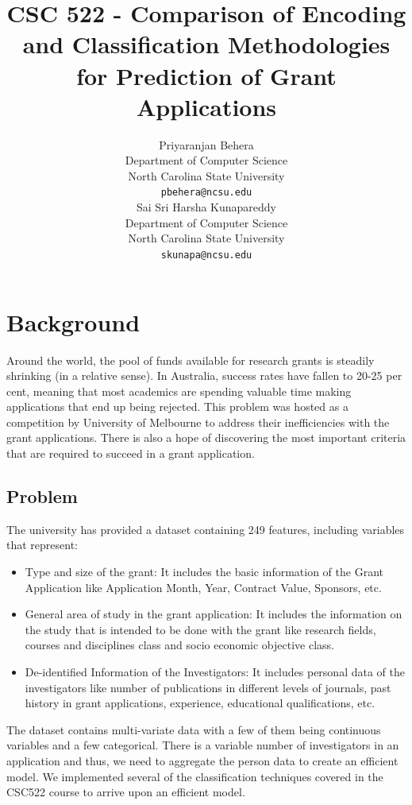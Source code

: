 \documentclass{article} %
\title{CSC 522 - Comparison of Encoding and Classification Methodologies for Prediction of Grant Applications}
\author{
	Priyaranjan Behera\\
	Department of Computer Science\\
	North Carolina State University\\
	\texttt{pbehera@ncsu.edu} \\
	\And
	Sai Sri Harsha Kunapareddy\\
	Department of Computer Science\\
	North Carolina State University\\
	\texttt{skunapa@ncsu.edu} \\
}
\begin{document}
	
	
	\maketitle
	
	\section{Background}
	
	Around the world, the pool of funds available for research grants is steadily shrinking (in a relative sense). In Australia, success rates have fallen to 20-25 per cent, meaning that most academics are spending valuable time making applications that end up being rejected. This problem was hosted as a competition by University of Melbourne to address their inefficiencies with the grant applications. There is also a hope of discovering the most important criteria that are required to succeed in a grant application. 
	
	\subsection{Problem}
	
	The university has provided a dataset containing 249 features, including variables that represent:
	
	\begin{itemize}
		\item Type and size of the grant: It includes the basic information of the Grant Application like Application Month, Year, Contract Value, Sponsors, etc.
		\item General area of study in the grant application: It includes the information on the study that is intended to be done with the grant like  research fields, courses and disciplines class and socio economic objective class.
		\item De-identified Information of the Investigators: It includes personal data of the investigators like number of publications in different levels of journals, past history in grant applications, experience, educational qualifications, etc.  
	\end{itemize}
	
	The dataset contains multi-variate data with a few of them being continuous variables and a few categorical. There is a variable number of investigators in an application and thus, we need to aggregate the person data to create an efficient model. We implemented several of the classification techniques covered in the CSC522 course to arrive upon an efficient model.
	
\end{document}

